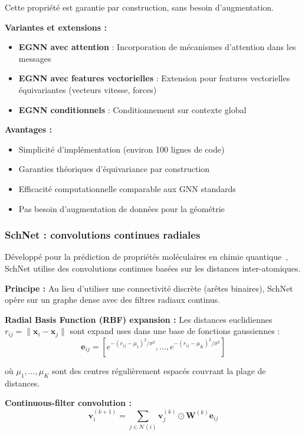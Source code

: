 Cette propriété est garantie par construction, sans besoin d'augmentation.

\textbf{Variantes et extensions :}

\begin{itemize}
    \item \textbf{EGNN avec attention} : Incorporation de mécanismes d'attention dans les messages
    \item \textbf{EGNN avec features vectorielles} : Extension pour features vectorielles équivariantes (vecteurs vitesse, forces)
    \item \textbf{EGNN conditionnels} : Conditionnement sur contexte global
\end{itemize}

\textbf{Avantages :}
\begin{itemize}
    \item Simplicité d'implémentation (environ 100 lignes de code)
    \item Garanties théoriques d'équivariance par construction
    \item Efficacité computationnelle comparable aux GNN standards
    \item Pas besoin d'augmentation de données pour la géométrie
\end{itemize}

\subsubsection{SchNet : convolutions continues radiales}

Développé pour la prédiction de propriétés moléculaires en chimie quantique~\cite{Schutt2017,Schutt2018}, SchNet utilise des convolutions continues basées sur les distances inter-atomiques.

\textbf{Principe :}
Au lieu d'utiliser une connectivité discrète (arêtes binaires), SchNet opère sur un graphe dense avec des filtres radiaux continus.

\textbf{Radial Basis Function (RBF) expansion :}
Les distances euclidiennes $r_{ij} = \|\mathbf{x}_i - \mathbf{x}_j\|$ sont expand uses dans une base de fonctions gaussiennes :
\[
\mathbf{e}_{ij} = [e^{-(r_{ij} - \mu_1)^2/\sigma^2}, \ldots, e^{-(r_{ij} - \mu_K)^2/\sigma^2}]
\]

où $\mu_1, \ldots, \mu_K$ sont des centres régulièrement espacés couvrant la plage de distances.

\textbf{Continuous-filter convolution :}
\[
\mathbf{v}_i^{(k+1)} = \sum_{j \in \mathcal{N}(i)} \mathbf{v}_j^{(k)} \odot \mathbf{W}^{(k)} \mathbf{e}_{ij}
\]

